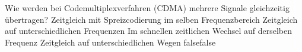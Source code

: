     {Wie werden bei Codemultiplexverfahren (CDMA) mehrere Signale gleichzeitig übertragen?}
    {Zeitgleich mit Spreizcodierung im selben Frequenzbereich}
    {Zeitgleich auf unterschiedlichen Frequenzen}
    {Im schnellen zeitlichen Wechsel auf derselben Frequenz}
    {Zeitgleich auf unterschiedlichen Wegen}
    {false}{false}